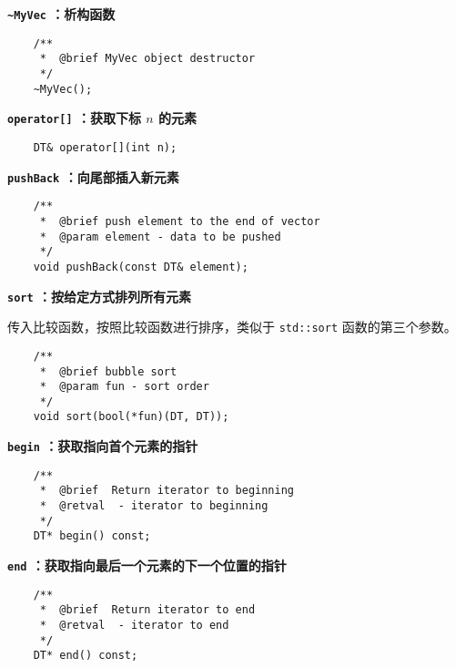 \documentclass[a4paper]{ctexart}
\begin{document}
\vspace{3em}

\noindent \textbf{\texttt{\textasciitilde MyVec} ：析构函数}

\begin{lstlisting}
    /**
     *  @brief MyVec object destructor
     */
    ~MyVec();
\end{lstlisting}

\vspace{3em}

\noindent \textbf{\texttt{operator[]} ：获取下标 $n$ 的元素}

\begin{lstlisting}
    DT& operator[](int n);
\end{lstlisting}

\vspace{3em}

\noindent \textbf{\texttt{pushBack} ：向尾部插入新元素}

\begin{lstlisting}
    /**
     *  @brief push element to the end of vector
     *  @param element - data to be pushed
     */
    void pushBack(const DT& element);
\end{lstlisting}

\vspace{2em}

\noindent \textbf{\texttt{sort} ：按给定方式排列所有元素}

传入比较函数，按照比较函数进行排序，类似于 \texttt{std::sort} 函数的第三个参数。

\begin{lstlisting}
    /**
     *  @brief bubble sort
     *  @param fun - sort order
     */
    void sort(bool(*fun)(DT, DT));
\end{lstlisting}

\vspace{2em}

\noindent \textbf{\texttt{begin} ：获取指向首个元素的指针}

\begin{lstlisting}
    /**
     *  @brief  Return iterator to beginning
     *  @retval  - iterator to beginning
     */
    DT* begin() const;
\end{lstlisting}

\vspace{2em}

\noindent \textbf{\texttt{end} ：获取指向最后一个元素的下一个位置的指针}

\begin{lstlisting}
    /**
     *  @brief  Return iterator to end
     *  @retval  - iterator to end
     */
    DT* end() const;
\end{lstlisting}
\end{document}
